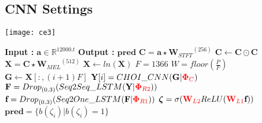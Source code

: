 \subsection{CNN Settings}

\begin{algorithm}
\begin{minipage}{0.15\textwidth}
\texttt{[image: ce3]}
\end{minipage}
  \begin{minipage}{0.80\textwidth}
  \caption{$\textbf{pred}$ = $Model$($\textbf{a}$) }\label{exp:a4}
   {\fontsize{8}{0}
  \begin{algorithmic}[1]
    \Statex \textbf{Input :} $\textbf{a} \in \mathbb{R}^{12000.t}$
    \Statex \textbf{Output :} $\textbf{pred}$ 
    \State $\textbf{C} = \textbf{a} \star {\textbf{W}_{STFT}}^{(256)}$ 
    \State $\textbf{C} \leftarrow \textbf{C} \odot \textbf{C}$
    \State $\textbf{X} = \textbf{C} \star {\textbf{W}_{MEL}}^{(512)}$ 
    \State $\textbf{X} \leftarrow ln(\textbf{X})$
    \State $F = 1366$
    \State $W = floor(\frac{P}{F})$
      \State $ \textbf{G} \leftarrow \textbf{X}[:,(i+1)F]$
      \State $\textbf{Y}[i] = CHOI\_CNN(\textbf{G} | {\color{red} \bm{\Phi}_{C}})$ 
     \EndFor
     \State $\textbf{F} = {Drop}_{(0.3)}(Seq2Seq\_LSTM(\textbf{Y} | {\color{red}\bm{\Phi}_{R2}} ))$ 
    \State $\textbf{f} = {Drop}_{(0.3)}(Seq2One\_LSTM(\textbf{F} | {\color{red}\bm{\Phi}_{R1}}))$ 
    \State $\bm{\zeta} = \sigma ({\color{red} \textbf{W}_{L2}} ReLU ({\color{red}\textbf{W}_{L1}}\textbf{f})) $ 
    \State $\textbf{pred} = \{ b(\zeta_{i}) | b(\zeta_{i}) = 1 \}$ 
  \end{algorithmic}
  }
  \end{minipage}
\end{algorithm}
\FloatBarrier

